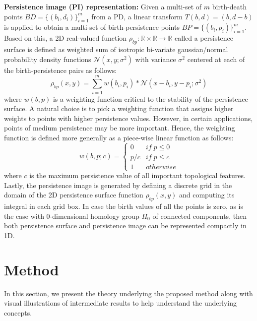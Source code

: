 \documentclass{article}
\begin{document}
\smallskip
\noindent \textbf{Persistence image (PI) representation:} Given a multi-set of $m$ birth-death points $BD=\{(b_i, d_i)\}_{i=1}^{m}$ from a PD, a linear transform $T(b, d) = (b, d-b)$ is applied to obtain a multi-set of birth-persistence points $BP=\{(b_i, p_i)\}_{i=1}^{m}$. Based on this, a 2D real-valued function $\rho_{bp} : \mathbb{R} \times \mathbb{R} \to \mathbb{R}$ called a persistence surface is defined as weighted sum of isotropic bi-variate gaussian/normal probability density functions $\mathcal{N}\left(x, y; \sigma^2\right)$ with variance $\sigma^2$ centered at each of the birth-persistence pairs as follows:
\begin{equation}
\rho_{bp}(x, y) = \sum_{i=1}^{m} w(b_i,p_i) * \mathcal{N}\left(x - b_i, y - p_i; \sigma^{2}\right)
\end{equation}
where $w(b, p)$ is a weighting function critical to the stability of the persistence surface. A natural choice is to pick a weighting function that assigns higher weights to points with higher persistence values. However, in certain applications, points of medium persistence may be more important. Hence, the weighting function is defined more generally as a piece-wise linear function as follows:
\begin{equation}
w(b, p; c) = \left\{\begin{array}{ll}
 0 & if \; p \leq 0\\ 
 p / c & if \; p \leq c\\ 
 1 & otherwise
\end{array}\right.    
\end{equation}
where $c$ is the maximum persistence value of all important topological features. Lastly, the persistence image is generated by defining a discrete grid in the domain of the 2D persistence surface function $\rho_{bp}(x, y)$ and computing its integral in each grid box. In case the birth values of all the points is zero, as is the case with 0-dimensional homology group $H_0$ of connected components, then both persistence surface and persistence image can be represented compactly in 1D.  

\vspace{-0.3cm}
\section{Method}
\label{sec:method}
In this section, we present the theory underlying the proposed method along with visual illustrations of intermediate results to help understand the underlying concepts. 
\end{document}
